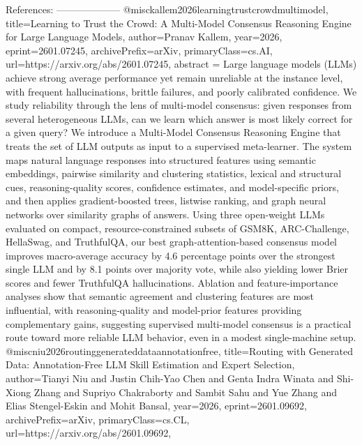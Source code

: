         References:
        --------------------
        @misc{kallem2026learningtrustcrowdmultimodel,
      title={Learning to Trust the Crowd: A Multi-Model Consensus Reasoning Engine for Large Language Models}, 
      author={Pranav Kallem},
      year={2026},
      eprint={2601.07245},
      archivePrefix={arXiv},
      primaryClass={cs.AI},
      url={https://arxiv.org/abs/2601.07245},
      abstract = {Large language models (LLMs) achieve strong average performance yet remain unreliable at the instance level, with frequent hallucinations, brittle failures, and poorly calibrated confidence. We study reliability through the lens of multi-model consensus: given responses from several heterogeneous LLMs, can we learn which answer is most likely correct for a given query? We introduce a Multi-Model Consensus Reasoning Engine that treats the set of LLM outputs as input to a supervised meta-learner. The system maps natural language responses into structured features using semantic embeddings, pairwise similarity and clustering statistics, lexical and structural cues, reasoning-quality scores, confidence estimates, and model-specific priors, and then applies gradient-boosted trees, listwise ranking, and graph neural networks over similarity graphs of answers. Using three open-weight LLMs evaluated on compact, resource-constrained subsets of GSM8K, ARC-Challenge, HellaSwag, and TruthfulQA, our best graph-attention-based consensus model improves macro-average accuracy by 4.6 percentage points over the strongest single LLM and by 8.1 points over majority vote, while also yielding lower Brier scores and fewer TruthfulQA hallucinations. Ablation and feature-importance analyses show that semantic agreement and clustering features are most influential, with reasoning-quality and model-prior features providing complementary gains, suggesting supervised multi-model consensus is a practical route toward more reliable LLM behavior, even in a modest single-machine setup.}
}@misc{niu2026routinggenerateddataannotationfree,
      title={Routing with Generated Data: Annotation-Free LLM Skill Estimation and Expert Selection}, 
      author={Tianyi Niu and Justin Chih-Yao Chen and Genta Indra Winata and Shi-Xiong Zhang and Supriyo Chakraborty and Sambit Sahu and Yue Zhang and Elias Stengel-Eskin and Mohit Bansal},
      year={2026},
      eprint={2601.09692},
      archivePrefix={arXiv},
      primaryClass={cs.CL},
      url={https://arxiv.org/abs/2601.09692},
}
